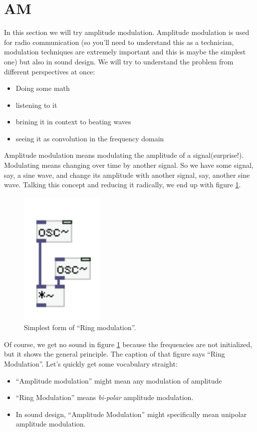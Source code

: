 \section{AM} %
\label{sub:AM}
In this section we will try amplitude modulation. Amplitude modulation is used for radio communication (so you'll need to understand this as a technician, modulation techniques are extremely important and this is maybe the simplest one) but also in sound design. We will try to understand the problem from different perspectives at once:
\begin{itemize}
	\item Doing some math
	\item listening to it
	\item brining it in context to beating waves
	\item seeing it as convolution in the frequency domain
\end{itemize}

Amplitude modulation means modulating the amplitude of a signal(surprise!). Modulating means changing over time by another signal. So we have some signal, say, a sine wave, and change its amplitude with another signal, say, another sine wave. Talking this concept and reducing it radically, we end up with figure \ref{fig:simpleAM}.

\begin{figure}[H]
	\begin{center}
		\includegraphics[width = 4cm]{img/ringNaive.png}
		\caption{Simplest form of ``Ring modulation''.}
		\label{fig:simpleAM}
	\end{center}
\end{figure}
Of course, we get no sound in figure \ref{fig:simpleAM} because the frequencies are not initialized, but it shows the general principle. The caption of that figure says ``Ring Modulation''. Let's quickly get some vocabulary straight:\\
\begin{itemize}
	\item ``Amplitude modulation'' might mean any modulation of amplitude
	\item ``Ring Modulation'' means \textit{bi-polar} amplitude modulation.
	\item In sound design, ``Amplitude Modulation'' might specifically mean unipolar amplitude modulation.
\end{itemize}

